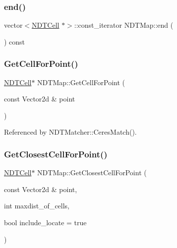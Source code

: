 \subsubsection{\texorpdfstring{end()}{end()}\hspace{0.1cm}{\footnotesize\ttfamily [2/2]}}
{\footnotesize\ttfamily vector$<$\hyperlink{classNDTCell}{N\+D\+T\+Cell} $\ast$$>$\+::const\+\_\+iterator N\+D\+T\+Map\+::end (\begin{DoxyParamCaption}{ }\end{DoxyParamCaption}) const\hspace{0.3cm}{\ttfamily [inline]}}

\mbox{\label{classNDTMap_a4d4dad624af3df75327d0e279be3d477}} 
\subsubsection{\texorpdfstring{Get\+Cell\+For\+Point()}{GetCellForPoint()}}
{\footnotesize\ttfamily \hyperlink{classNDTCell}{N\+D\+T\+Cell}$\ast$ N\+D\+T\+Map\+::\+Get\+Cell\+For\+Point (\begin{DoxyParamCaption}\item[{const Vector2d \&}]{point }\end{DoxyParamCaption})\hspace{0.3cm}{\ttfamily [inline]}}



Referenced by N\+D\+T\+Matcher\+::\+Ceres\+Match().

\mbox{\label{classNDTMap_a304a9fa19f39944b49d0ab3d84bf5aae}} 
\subsubsection{\texorpdfstring{Get\+Closest\+Cell\+For\+Point()}{GetClosestCellForPoint()}}
{\footnotesize\ttfamily \hyperlink{classNDTCell}{N\+D\+T\+Cell}$\ast$ N\+D\+T\+Map\+::\+Get\+Closest\+Cell\+For\+Point (\begin{DoxyParamCaption}\item[{const Vector2d \&}]{point,  }\item[{int}]{maxdist\+\_\+of\+\_\+cells,  }\item[{bool}]{include\+\_\+locate = {\ttfamily true} }\end{DoxyParamCaption})\hspace{0.3cm}{\ttfamily [inline]}}

